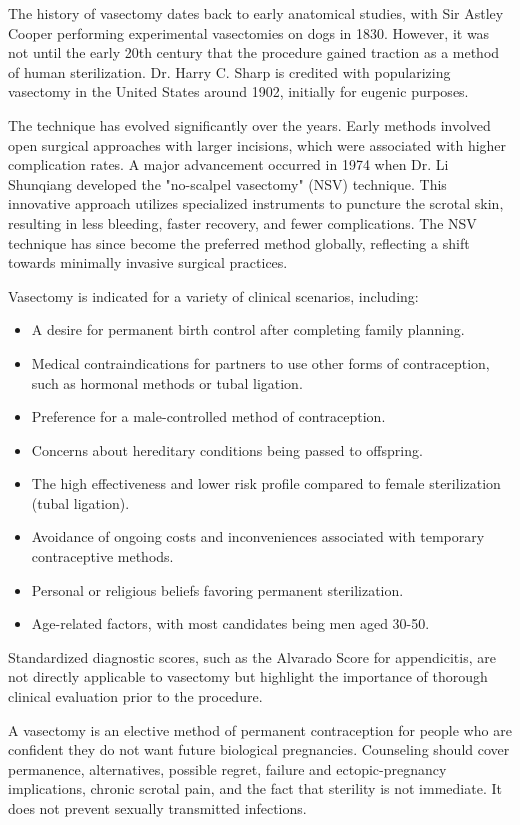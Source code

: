 The history of vasectomy dates back to early anatomical studies, with Sir Astley Cooper performing experimental vasectomies on dogs in 1830. However, it was not until the early 20th century that the procedure gained traction as a method of human sterilization. Dr. Harry C. Sharp is credited with popularizing vasectomy in the United States around 1902, initially for eugenic purposes.

The technique has evolved significantly over the years. Early methods involved open surgical approaches with larger incisions, which were associated with higher complication rates. A major advancement occurred in 1974 when Dr. Li Shunqiang developed the "no-scalpel vasectomy" (NSV) technique. This innovative approach utilizes specialized instruments to puncture the scrotal skin, resulting in less bleeding, faster recovery, and fewer complications. The NSV technique has since become the preferred method globally, reflecting a shift towards minimally invasive surgical practices.

Vasectomy is indicated for a variety of clinical scenarios, including:

\begin{itemize}
  \item A desire for permanent birth control after completing family planning.
  \item Medical contraindications for partners to use other forms of contraception, such as hormonal methods or tubal ligation.
  \item Preference for a male-controlled method of contraception.
  \item Concerns about hereditary conditions being passed to offspring.
  \item The high effectiveness and lower risk profile compared to female sterilization (tubal ligation).
  \item Avoidance of ongoing costs and inconveniences associated with temporary contraceptive methods.
  \item Personal or religious beliefs favoring permanent sterilization.
  \item Age-related factors, with most candidates being men aged 30-50.
\end{itemize}

Standardized diagnostic scores, such as the Alvarado Score for appendicitis, are not directly applicable to vasectomy but highlight the importance of thorough clinical evaluation prior to the procedure.

A vasectomy is an elective method of permanent contraception for people who are confident they do not want future biological pregnancies. Counseling should cover permanence, alternatives, possible regret, failure and ectopic-pregnancy implications, chronic scrotal pain, and the fact that sterility is not immediate. It does not prevent sexually transmitted infections.

